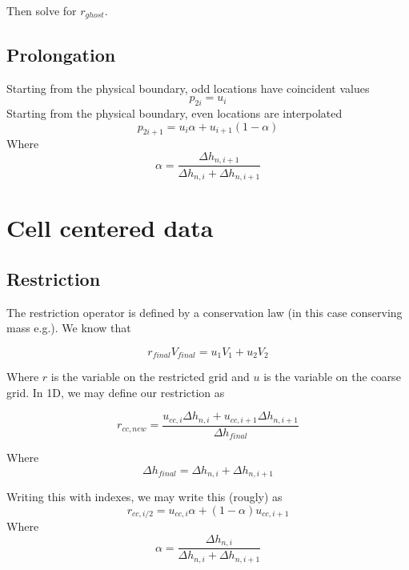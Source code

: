 \documentclass[11pt]{article}
\begin{document}
Then solve for $r_{ghost}$.

\subsection{Prolongation}
Starting from the physical boundary, odd locations have coincident values
\begin{equation}
	p_{2i} = u_{i}
\end{equation}
Starting from the physical boundary, even locations are interpolated
\begin{equation}
	p_{2i+1} = u_{i}\alpha + u_{i+1}(1 - \alpha)
\end{equation}
Where
\begin{equation}
	\alpha = \frac{\Delta h_{n,i+1}}{\Delta h_{n,i} + \Delta h_{n,i+1}}
\end{equation}

\section{Cell centered data}

\subsection{Restriction}
The restriction operator is defined by a conservation law (in this case conserving mass e.g.). We know that

\begin{equation}
	r_{final} V_{final} = u_1 V_1 + u_2 V_2
\end{equation}

Where $r$ is the variable on the restricted grid and $u$ is the variable on the coarse grid.
In 1D, we may define our restriction as

\begin{equation}
	r_{cc,new} = \frac{u_{cc,i} \Delta h_{n,i} +u_{cc,i+1} \Delta h_{n,i+1} }{\Delta h_{final}}
\end{equation}

Where
\begin{equation}
	\Delta h_{final} = \Delta h_{n,i} + \Delta h_{n,i+1}
\end{equation}

Writing this with indexes, we may write this (rougly) as
\begin{equation}
	r_{cc,i/2} = u_{cc,i} \alpha + (1-\alpha)u_{cc,i+1}
\end{equation}
Where
\begin{equation}
	\alpha = \frac{\Delta h_{n,i}}{\Delta h_{n,i}+\Delta h_{n,i+1}}
\end{equation}
\end{document}
